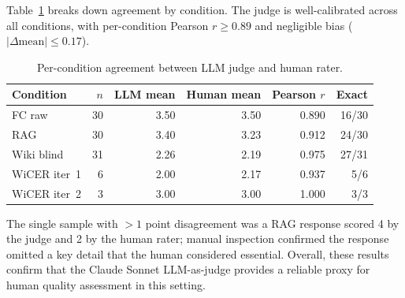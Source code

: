 \documentclass{article}
\begin{document}
Table~\ref{tab:human_cond} breaks down agreement by condition.
The judge is well-calibrated across all conditions, with per-condition
Pearson $r \geq 0.89$ and negligible bias ($|\Delta\text{mean}| \leq 0.17$).

\begin{table}[h]
\centering
\caption{Per-condition agreement between LLM judge and human rater.}
\label{tab:human_cond}
\small
\begin{tabular}{lrrrrr}
\toprule
\textbf{Condition} & $n$ & \textbf{LLM mean} & \textbf{Human mean} & \textbf{Pearson $r$} & \textbf{Exact} \\
\midrule
FC raw        & 30 & 3.50 & 3.50 & 0.890 & 16/30 \\
RAG           & 30 & 3.40 & 3.23 & 0.912 & 24/30 \\
Wiki blind    & 31 & 2.26 & 2.19 & 0.975 & 27/31 \\
WiCER iter~1  &  6 & 2.00 & 2.17 & 0.937 &  5/6  \\
WiCER iter~2  &  3 & 3.00 & 3.00 & 1.000 &  3/3  \\
\bottomrule
\end{tabular}
\end{table}

The single sample with $>1$ point disagreement was a RAG response
scored 4 by the judge and 2 by the human rater; manual inspection
confirmed the response omitted a key detail that the human considered
essential. Overall, these results confirm that the Claude Sonnet
LLM-as-judge provides a reliable proxy for human quality assessment
in this setting.
\end{document}
